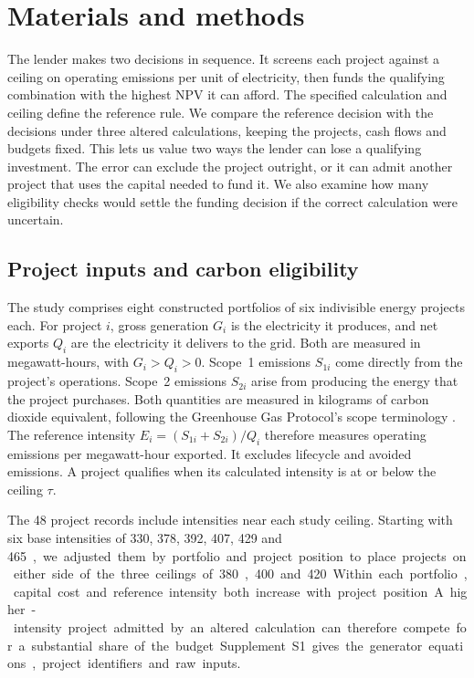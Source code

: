 \section{Materials and methods}
The lender makes two decisions in sequence. It screens each project against a ceiling on operating emissions per unit of electricity, then funds the qualifying combination with the highest NPV it can afford. The specified calculation and ceiling define the reference rule. We compare the reference decision with the decisions under three altered calculations, keeping the projects, cash flows and budgets fixed. This lets us value two ways the lender can lose a qualifying investment. The error can exclude the project outright, or it can admit another project that uses the capital needed to fund it. We also examine how many eligibility checks would settle the funding decision if the correct calculation were uncertain.

\subsection{Project inputs and carbon eligibility}
The study comprises eight constructed portfolios of six indivisible energy projects each. For project $i$, gross generation $G_i$ is the electricity it produces, and net exports $Q_i$ are the electricity it delivers to the grid. Both are measured in megawatt-hours, with $G_i>Q_i>0$. Scope~1 emissions $S_{1i}$ come directly from the project's operations. Scope~2 emissions $S_{2i}$ arise from producing the energy that the project purchases. Both quantities are measured in kilograms of carbon dioxide equivalent, following the Greenhouse Gas Protocol's scope terminology \citep{ghg}. The reference intensity $E_i=(S_{1i}+S_{2i})/Q_i$ therefore measures operating emissions per megawatt-hour exported. It excludes lifecycle and avoided emissions. A project qualifies when its calculated intensity is at or below the ceiling $\tau$.

The 48 project records include intensities near each study ceiling. Starting with six base intensities of 330, 378, 392, 407, 429 and 465~\unit, we adjusted them by portfolio and project position to place projects on either side of the three ceilings of 380, 400 and 420~\unit. Within each portfolio, capital cost and reference intensity both increase with project position. A higher-intensity project admitted by an altered calculation can therefore compete for a substantial share of the budget. Supplement~S1 gives the generator equations, project identifiers and raw inputs.

